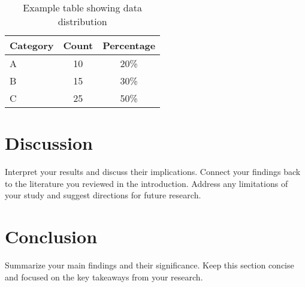 \documentclass[12pt, titlepage]{article}
\begin{document}
  \begin{table}[ht]
    \centering
    \begin{tabular}{lcc}
      \hline
      Category & Count & Percentage \\
      \hline
      A & 10 & 20\% \\
      B & 15 & 30\% \\
      C & 25 & 50\% \\
      \hline
    \end{tabular}
    \caption{Example table showing data distribution}
    \label{tab:distribution}
  \end{table}

\section{Discussion}
  Interpret your results and discuss their implications. Connect your findings 
  back to the literature you reviewed in the introduction. Address any 
  limitations of your study and suggest directions for future research.

\section{Conclusion}
  Summarize your main findings and their significance. Keep this section concise 
  and focused on the key takeaways from your research.

\singlespacing  %


\end{document}
